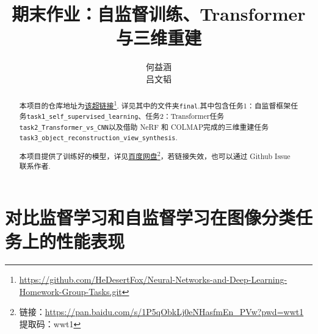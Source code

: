 \documentclass[notitlepage,cs4size,punct,oneside]{ctexrep}
\title{{\zihao{1}\bfseries 期末作业：自监督训练、Transformer与三维重建}}
\author{何益涵 \quad 20307110032\\吕文韬 \quad 23210180109}
\date{}
\numberwithin{equation}{chapter}
\theoremstyle{mystyle}
\begin{document}
\CTEXoptions[abstractname={摘要: }]
\CTEXoptions[bibname={\bfseries 参考文献}]

\renewcommand{\thepage}{\roman{page}}
\setcounter{page}{1}

\maketitle\renewcommand{\thepage}{\arabic{page}}
\thispagestyle{empty}\setcounter{page}{0}
\renewcommand{\abstractname}{摘要: }
\begin{abstract}
     本项目的仓库地址为\href{https://github.com/HeDesertFox/Neural-Networks-and-Deep-Learning-Homework-Group-Tasks.git}{该超链接}\footnote{\href{https://github.com/HeDesertFox/Neural-Networks-and-Deep-Learning-Homework-Group-Tasks.git}{https://github.com/HeDesertFox/Neural-Networks-and-Deep-Learning-Homework-Group-Tasks.git}}. 详见其中的文件夹\texttt{final}.其中包含任务1：自监督框架任务\texttt{task1\_self\_supervised\_learning}、任务2：Transformer任务\texttt{task2\_Transformer\_vs\_CNN}以及借助 NeRF 和 COLMAP完成的三维重建任务\texttt{task3\_object\_reconstruction\_view\_synthesis}.

     本项目提供了训练好的模型，详见\href{}{百度网盘}\footnote{链接：\href{https://pan.baidu.com/s/1P5qObkLj0eNHasfmEn_PVw?pwd=wwt1}{https://pan.baidu.com/s/1P5qObkLj0eNHasfmEn_PVw?pwd=wwt1} 提取码：wwt1}，若链接失效，也可以通过 Github Issue 联系作者.


\end{abstract}



\chapter{对比监督学习和自监督学习在图像分类任务上的性能表现}
\end{document}
